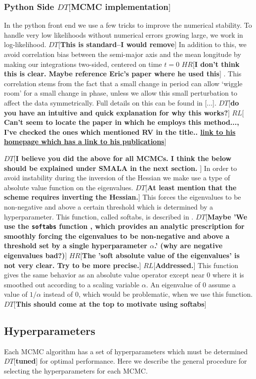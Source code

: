 \documentclass{aa}
\def\memohr#1{\color{blue}$HR[${\bf #1}$]$ \color{black}}
\def\memodt#1{\color{green}$DT[${\bf #1}$]$ \color{black}}
\def\memorl#1{\color{gray}$RL[${\bf #1}$]$ \color{black}}
\begin{document}
\subsubsection{Python Side \memodt{MCMC implementation}}
In the python front end we use a few tricks to improve the numerical stability. 
To handle very low likelihoods without numerical errors growing large, we work in log-likelihood. \memodt{This is standard--I would remove}
In addition to this, we avoid correlation bias between the semi-major axis and the mean longitude by making our integrations two-sided, centered on time $t=0$ \memohr{I don't think this is clear. Maybe reference Eric's paper where he used this}.
This correlation stems from the fact that a small change in period can allow `wiggle room' for a small change in phase, unless we allow this small perturbation to affect the data symmetrically.
Full details on this can be found in [...]. \memodt{do you have an intuitive and quick explanation for why this works?}
\memorl{Can't seem to locate the paper in which he employs this method..., I've checked the ones which mentioned RV in the title.. \href{http://astro.psu.edu/people/ebf11}{link to his homepage which has a link to his publications}}

\memodt{I believe you did the above for all MCMCs. I think the below should be explained under SMALA in the next section. }
In order to avoid instability during the inversion of the Hessian we make use a type of absolute value function on the eigenvalues. \memodt{At least mention that the scheme requires inverting the Hessian.}
This forces the eigenvalues to be non-negative and above a certain threshold which is determined by a hyperparameter.
This function, called softabs, is described in \cite{softabs}.
\memodt{Maybe 'We use the \texttt{softabs} function \citep{softabs}, which provides an analytic prescription for smoothly forcing the eigenvalues to be non-negative and above a threshold set by a single hyperparameter $\alpha$.' (why are negative eigenvalues bad?)}
\memohr{The 'soft absolute value of the eigenvalues' is not very clear. Try to be more precise.} 
\memorl{Addressed.}
This function gives the same behavior as an absolute value operator except near $0$ where it is smoothed out according to a scaling variable $\alpha$.
An eigenvalue of $0$ assume a value of $1/\alpha$ instead of $0$, which would be problematic, when we use this function. \memodt{This should come at the top to motivate using softabs}

\subsection{Hyperparameters}\label{hyper}
Each MCMC algorithm has a set of hyperparameters which must be determined \memodt{tuned} for optimal performance. Here we describe the general procedure for selecting the hyperparameters for each MCMC.
\end{document}
